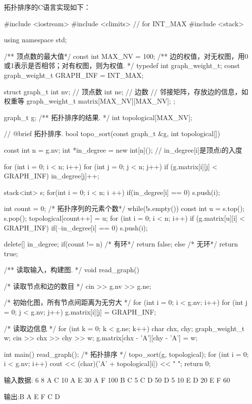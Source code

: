 拓扑排序的C语言实现如下：
\begin{Codex}[label=am_graph_topo_sort.cpp]
    #include <iostream>
    #include <climits>  // for INT_MAX
    #include <stack>

    using namespace std;

    /** 顶点数的最大值*/
    const int MAX_NV = 100;
    /** 边的权值，对无权图，用0或1表示是否相邻；对有权图，则为权值. */
    typedef int graph_weight_t;
    const graph_weight_t GRAPH_INF = INT_MAX;

    struct graph_t {
        int nv; // 顶点数
        int ne; // 边数
        // 邻接矩阵，存放边的信息，如权重等
        graph_weight_t matrix[MAX_NV][MAX_NV];
    };

    graph_t g;
    /** 拓扑排序的结果. */
    int topological[MAX_NV];

    // @brief 拓扑排序.
    bool topo_sort(const graph_t &g, int topological[]) {
        const int n = g.nv;
        int *in_degree = new int[n](); // in_degree[i]是顶点i的入度

        for (int i = 0; i < n; i++) {
            for (int j = 0; j < n; j++) {
                if (g.matrix[i][j] < GRAPH_INF)
                    in_degree[j]++;
            }
        }

        stack<int> s;
        for(int i = 0; i < n; i ++) {
            if(in_degree[i] == 0)
                s.push(i);
        }

        int count = 0; /* 拓扑序列的元素个数*/
        while(!s.empty()) {
            const int u = s.top(); s.pop();
            topological[count++] = u;
            for (int i = 0; i < n; i++) if (g.matrix[u][i] < GRAPH_INF) {
                if(--in_degree[i] == 0) s.push(i);
            }
        }

        delete[] in_degree;
        if(count != n) { /* 有环*/
            return false;
        } else { /* 无环*/
            return true;
        }
    }

    /** 读取输入，构建图. */
    void read_graph() {
        /* 读取节点和边的数目 */
        cin >> g.nv >> g.ne;

        /* 初始化图，所有节点间距离为无穷大 */
        for (int i = 0; i < g.nv; i++) {
            for (int j = 0; j < g.nv; j++) {
                g.matrix[i][j] = GRAPH_INF;
            }
        }

        /* 读取边信息 */
        for (int k = 0; k < g.ne; k++) {
            char chx, chy;
            graph_weight_t w;
            cin >> chx >> chy >> w;
            g.matrix[chx - 'A'][chy - 'A'] = w;
        }
    }
    int main() {
        read_graph();
        /* 拓扑排序 */
        topo_sort(g, topological);
        for (int i = 0; i < g.nv; i++) {
            cout << (char)('A' + topological[i]) << " ";
        }
        return 0;
    }

    输入数据:
        6 8
        A C 10
        A E 30
        A F 100
        B C 5
        C D 50
        D 5 10
        E D 20
        E F 60

    输出:B A E F C D
\end{Codex}


